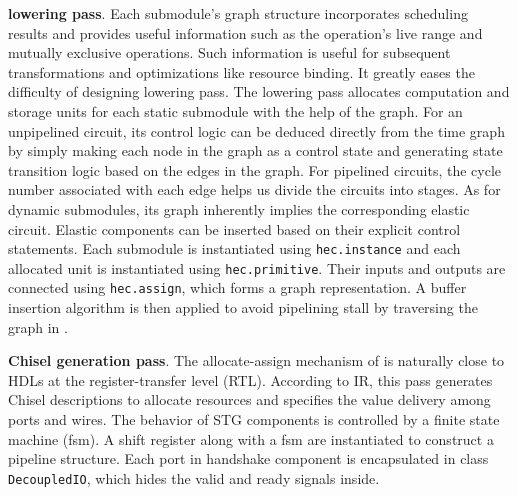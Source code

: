 \textbf{\tor lowering pass}. 
Each submodule's \tor graph structure incorporates scheduling results and provides useful information such as the operation's live range and mutually exclusive operations. Such information is useful for subsequent transformations and optimizations like resource binding. It greatly eases the difficulty of designing \tor lowering pass. The \tor lowering pass allocates computation and storage units for each static submodule with the help of the \tor graph. For an unpipelined circuit, its control logic can be deduced directly from the time graph by simply making each node in the \tor graph as a control state and generating state transition logic based on the edges in the \tor graph. For pipelined circuits, the cycle number associated with each edge helps us divide the circuits into stages. As for dynamic submodules, its \tor graph inherently implies the corresponding elastic circuit. Elastic components can be inserted based on their explicit control statements. Each submodule is instantiated using \verb|hec.instance| and each allocated unit is instantiated using \verb|hec.primitive|. Their inputs and outputs are connected using \verb|hec.assign|, which forms a graph representation. A buffer insertion algorithm is then applied to avoid pipelining stall by traversing the graph in \hec. 




\textbf{Chisel generation pass}. 
The allocate-assign mechanism of \hec is naturally close to HDLs at the register-transfer level (RTL). According to \hec IR, this pass generates Chisel descriptions to allocate resources and specifies the value delivery among ports and wires. 
 The behavior of STG components is controlled by a finite state machine (fsm). A shift register along with a fsm are instantiated to construct a pipeline structure. Each port in handshake component is encapsulated in class \texttt{DecoupledIO}, which hides the valid and ready signals inside.



